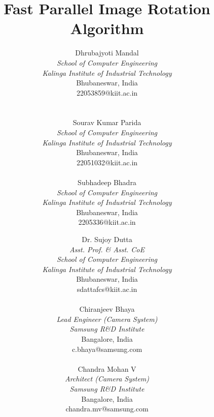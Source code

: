\documentclass[conference]{IEEEtran}
\begin{document}
\title{Fast Parallel Image Rotation Algorithm}



\author {%

Dhrubajyoti Mandal \\
\textit{School of Computer Engineering} \\
\textit{Kalinga Institute of Industrial Technology} \\
Bhubaneswar, India \\
22053859@kiit.ac.in \\ \\ \\

Sourav Kumar Parida \\
\textit{School of Computer Engineering} \\
\textit{Kalinga Institute of Industrial Technology} \\
Bhubaneswar, India \\
22051032@kiit.ac.in \\ \\ 

Subhadeep Bhadra \\
\textit{School of Computer Engineering} \\
\textit{Kalinga Institute of Industrial Technology} \\
Bhubaneswar, India \\
2205336@kiit.ac.in

\and %

Dr. Sujoy Dutta \\
\textit{Asst. Prof. \& Asst. CoE} \\
\textit{School of Computer Engineering} \\
\textit{Kalinga Institute of Industrial Technology} \\
Bhubaneswar, India \\
sdattafcs@kiit.ac.in \\ \\ 

Chiranjeev Bhaya \\
\textit{Lead Engineer (Camera System)} \\
\textit{Samsung R\&D Institute} \\
Bangalore, India \\
c.bhaya@samsung.com \\ \\ 

Chandra Mohan V \\
\textit{Architect (Camera System)} \\
\textit{Samsung R\&D Institute} \\
Bangalore, India \\
chandra.mv@samsung.com
}
\end{document}
